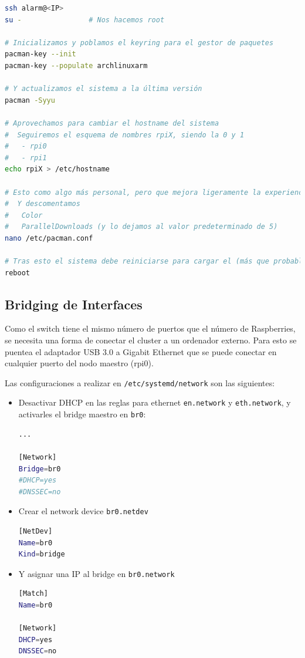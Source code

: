 \begin{lstlisting}[language=bash]
ssh alarm@<IP>
su -                # Nos hacemos root

# Inicializamos y poblamos el keyring para el gestor de paquetes
pacman-key --init
pacman-key --populate archlinuxarm

# Y actualizamos el sistema a la última versión
pacman -Syyu

# Aprovechamos para cambiar el hostname del sistema
#  Seguiremos el esquema de nombres rpiX, siendo la 0 y 1
#   - rpi0
#   - rpi1
echo rpiX > /etc/hostname

# Esto como algo más personal, pero que mejora ligeramente la experiencia en las actualizaciones, editamos el archivo /etc/pacman.conf
#  Y descomentamos
#   Color
#   ParallelDownloads (y lo dejamos al valor predeterminado de 5)
nano /etc/pacman.conf

# Tras esto el sistema debe reiniciarse para cargar el (más que probable) kernel actualizado
reboot
\end{lstlisting}

\subsection{Bridging de Interfaces}
Como el switch tiene el mismo número de puertos que el número de Raspberries, se necesita una forma de conectar el cluster a un ordenador externo. Para esto se puentea el adaptador USB 3.0 a Gigabit Ethernet que se puede conectar en cualquier puerto del nodo maestro (rpi0).

Las configuraciones a realizar en \texttt{/etc/systemd/network} son las siguientes:

\begin{itemize}
    \item Desactivar DHCP en las reglas para ethernet \texttt{en.network} y \texttt{eth.network}, y activarles el bridge maestro en \texttt{br0}:
\begin{lstlisting}[language=bash]
...

[Network]
Bridge=br0
#DHCP=yes
#DNSSEC=no
\end{lstlisting}
    \item Crear el network device \texttt{br0.netdev}
\begin{lstlisting}[language=bash]
[NetDev]
Name=br0
Kind=bridge
\end{lstlisting}
    \item Y asignar una IP al bridge en \texttt{br0.network}
\begin{lstlisting}[language=bash]
[Match]
Name=br0

[Network]
DHCP=yes
DNSSEC=no
\end{lstlisting}
\end{itemize}

